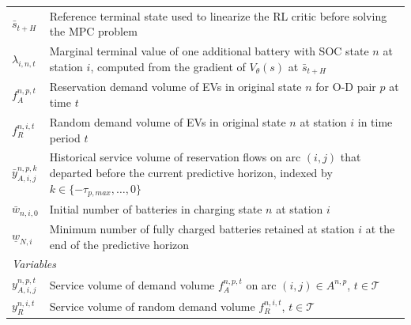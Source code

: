\documentclass[12pt,hyperref,a4paper,UTF8]{ctexart}
\begin{document}
\begin{table}[!htbp]
\begin{tabular}{@{}lp{13cm}@{}}
    $\bar{s}_{t+H}$ & Reference terminal state used to linearize the RL critic before solving the MPC problem \\
    $\lambda_{i,n,t}$ & Marginal terminal value of one additional battery with SOC state $n$ at station $i$, computed from the gradient of $V_{\theta}(s)$ at $\bar{s}_{t+H}$ \\
    $f_A^{n,p,t}$ & Reservation demand volume of EVs in original state $n$ for O-D pair $p$ at time $t$ \\
    $f_{R}^{n,i,t}$ & Random demand volume of EVs in original state $n$ at station $i$ in time period $t$ \\
    $\bar{y}_{A,i,j}^{n,p,k}$ & Historical service volume of reservation flows on arc $(i,j)$ that departed before the current predictive horizon, indexed by $k\in\{-\tau_{p,max},\dots,0\}$ \\
    $\bar{w}_{n,i,0}$ & Initial number of batteries in charging state $n$ at station $i$ \\
    $\underline{w}_{N,i}$ & Minimum number of fully charged batteries retained at station $i$ at the end of the predictive horizon \\
    \midrule
    \multicolumn{2}{l}{\textit{Variables}} \\
    $y_{A,i,j}^{n,p,t}$ & Service volume of demand volume $f_{A}^{n,p,t}$ on arc $(i,j) \in A^{n,p}$, $t\in\mathcal{T}$ \\
    $y_{R}^{n,i,t}$ & Service volume of random demand volume $f_{R}^{n,i,t}$, $t\in\mathcal{T}$\\

\end{tabular}
\end{table}
\end{document}
